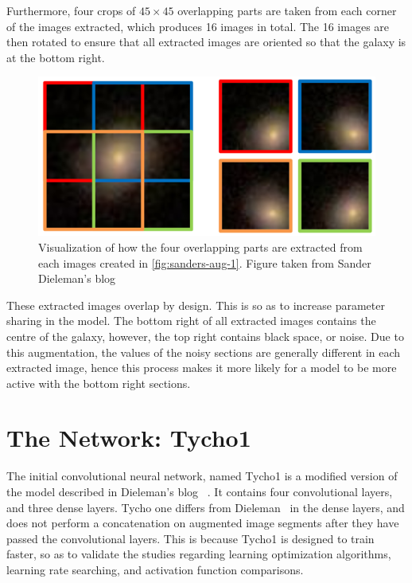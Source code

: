 \documentclass[12pt,a4paper,oneside,oldfontcommands]{memoir}
\begin{document}
Furthermore, four crops of \(45\times45\) overlapping parts are taken from each corner of the images extracted, which produces 16 images in total. The 16 images are then rotated to ensure that all extracted images are oriented so that the galaxy is at the bottom right.


\begin{figure}[H]
  \centering
    \includegraphics[width=\linewidth]{images/sanders-aug-2.png}
    \caption{Visualization of how the four overlapping parts are extracted from each images created in \ref{fig:sanders-aug-1}. Figure taken from Sander Dieleman's blog~\cite{Sanders-GZ}}
    \label{fig:sanders-aug-2}
\end{figure}

These extracted images overlap by design. This is so as to increase parameter sharing in the model. The bottom right of all extracted images contains the centre of the galaxy, however, the top right contains black space, or noise. Due to this augmentation, the values of the noisy sections are generally different in each extracted image, hence this process makes it more likely for a model to be more active with the bottom right sections.

\chapter{The Network: Tycho1}



The initial convolutional neural network, named Tycho1 is a modified version of the model described in Dieleman's blog ~\cite{Sanders-GZ}. It contains four convolutional layers, and three dense layers. Tycho one differs from Dieleman~\cite{Sanders-GZ} in the dense layers, and does not perform a concatenation on augmented image segments after they have passed the convolutional layers. This is because Tycho1 is designed to train faster, so as to validate the studies regarding learning optimization algorithms, learning rate searching, and activation function comparisons. 
\end{document}
